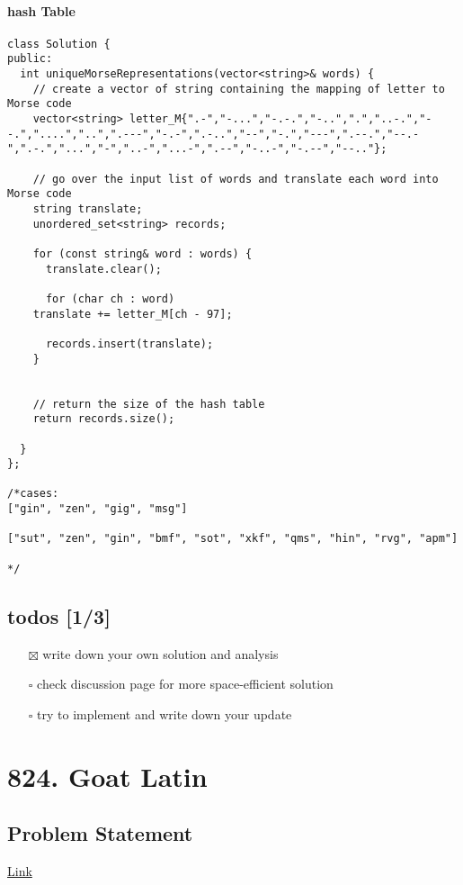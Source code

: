 \documentclass[12pt]{article}
\begin{document}
\paragraph{hash Table}
\label{sec:orge545c59}
\begin{verbatim}
class Solution {
public:
  int uniqueMorseRepresentations(vector<string>& words) {
    // create a vector of string containing the mapping of letter to Morse code 
    vector<string> letter_M{".-","-...","-.-.","-..",".","..-.","--.","....","..",".---","-.-",".-..","--","-.","---",".--.","--.-",".-.","...","-","..-","...-",".--","-..-","-.--","--.."};

    // go over the input list of words and translate each word into Morse code
    string translate;
    unordered_set<string> records;

    for (const string& word : words) {
      translate.clear();

      for (char ch : word)
	translate += letter_M[ch - 97];

      records.insert(translate);
    }


    // return the size of the hash table 
    return records.size();

  }
};

/*cases: 
["gin", "zen", "gig", "msg"]

["sut", "zen", "gin", "bmf", "sot", "xkf", "qms", "hin", "rvg", "apm"]

*/
\end{verbatim}
\subsection{todos [1/3]}
\label{sec:orgd8ff985}
\begin{itemize}
\item[{$\boxtimes$}] write down your own solution and analysis
\item[{$\square$}] check discussion page for more space-efficient solution
\item[{$\square$}] try to implement and write down your update
\end{itemize}
\section{824. Goat Latin}
\label{sec:org1f4c9bd}
\subsection{Problem Statement}
\label{sec:org420c4fb}
\href{https://leetcode.com/problems/goat-latin/}{Link}
\end{document}
